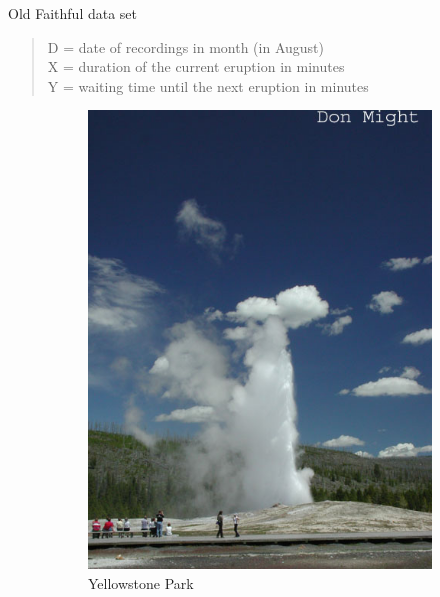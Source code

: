 \documentclass[aspectratio=169]{beamer}
\begin{document}
\begin{frame}{Old Faithful data set}

\begin{quote}
D = date of recordings in month (in August) \\
X = duration of the current eruption in minutes \\
Y = waiting time until the next eruption in minutes \\
\end{quote}

\begin{figure}
        \centering
        \begin{subfigure}[b]{0.25\textwidth}
                \includegraphics[width=\textwidth]{images/of1.jpg}
                \caption{Yellowstone Park}                
        \end{subfigure}    
        \begin{subfigure}[b]{0.5\textwidth}

\end{subfigure}
\end{figure}
\end{frame}
\end{document}
